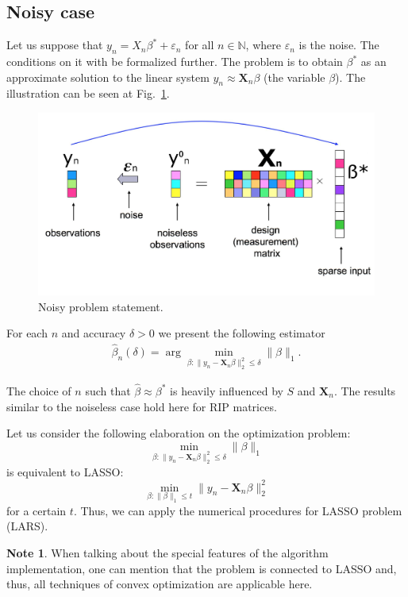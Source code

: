 \documentclass[11pt]{article}
\numberwithin{equation}{section}
\theoremstyle{definition}
\newtheorem{remark}{Note}[section]
\begin{document}
\subsection{Noisy case}
Let us suppose that $y_n = X_n \beta^* + \varepsilon_n$ for all $n \in \mathbb N$, where $\varepsilon_n$ is the noise.
The conditions on it with be formalized further.
The problem is to obtain $\beta^*$ as an approximate solution to the linear system $y_n \approx \mathbf X_n \beta$ (the variable $\beta$).
The illustration can be seen at Fig.~\ref{fig:NoisyProblemStatement}.
\begin{figure}[H]
    \begin{center}
        \includegraphics[width=.75\textwidth]{figures/problem_statement_3_noisy.pdf}
    \end{center}
    \caption{
        \label{fig:NoisyProblemStatement}
        Noisy problem statement.
    }
\end{figure}

For each $n$ and accuracy $\delta > 0$ we present the following estimator
\begin{gather*}
    \hat \beta_n(\delta) = \arg \min_{\beta: \|y_n - \mathbf X_n \beta\|_2^2 \leqslant \delta} \|\beta\|_1.
\end{gather*}

The choice of $n$ such that $\hat \beta \approx \beta^*$ is heavily influenced by $S$ and $\mathbf X_n$.
The results similar to the noiseless case hold here for RIP matrices.

Let us consider the following elaboration on the optimization problem:
$$ \min_{\beta: \|y_n - \mathbf X_n \beta\|_2^2 \leqslant \delta} \|\beta\|_1 $$
is equivalent to LASSO:
$$ \min_{\beta: \|\beta\|_1 \leqslant t} \|y_n - \mathbf X_n \beta\|_2^2 $$
for a certain $t$.
Thus, we can apply the numerical procedures for LASSO problem (LARS).
\begin{remark}
    When talking about the special features of the algorithm implementation,
    one can mention that the problem is connected to LASSO and, thus, all techniques of convex optimization are applicable here.
\end{remark}
\end{document}
